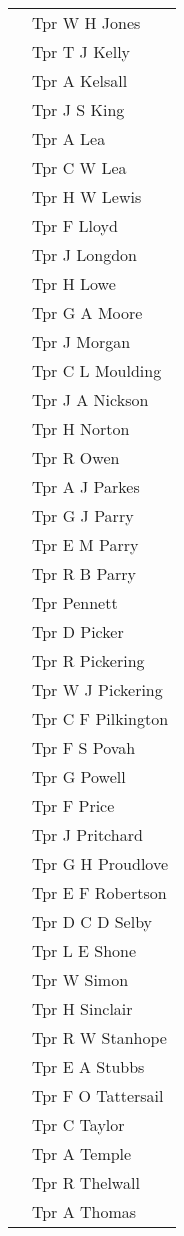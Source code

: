 \begin{center}
\begin{tabular}{rl}
    & Tpr W H Jones \\
    & Tpr T J Kelly \\
    & Tpr A Kelsall \\
    & Tpr J S King \\
    & Tpr A Lea \\
    & Tpr C W Lea \\
    & Tpr H W Lewis \\
    & Tpr F Lloyd \\
    & Tpr J Longdon \\
    & Tpr H Lowe \\
    & Tpr G A Moore \\
    & Tpr J Morgan \\
    & Tpr C L Moulding \\
    & Tpr J A Nickson \\
    & Tpr H Norton \\
    & Tpr R Owen \\
    & Tpr A J Parkes \\
    & Tpr G J Parry \\
    & Tpr E M Parry \\
    & Tpr R B Parry \\
    & Tpr Pennett \\
    & Tpr D Picker \\
    & Tpr R Pickering \\
    & Tpr W J Pickering \\
    & Tpr C F Pilkington \\
    & Tpr F S Povah \\
    & Tpr G Powell \\
    & Tpr F Price \\
    & Tpr J Pritchard \\
    & Tpr G H Proudlove \\
    & Tpr E F Robertson \\
    & Tpr D C D Selby \\
    & Tpr L E Shone \\
    & Tpr W Simon \\
    & Tpr H Sinclair \\
    & Tpr R W Stanhope \\
    & Tpr E A Stubbs \\
    & Tpr F O Tattersail \\
    & Tpr C Taylor \\
    & Tpr A Temple \\
    & Tpr R Thelwall \\
    & Tpr A Thomas \\

\end{tabular}
\end{center}
